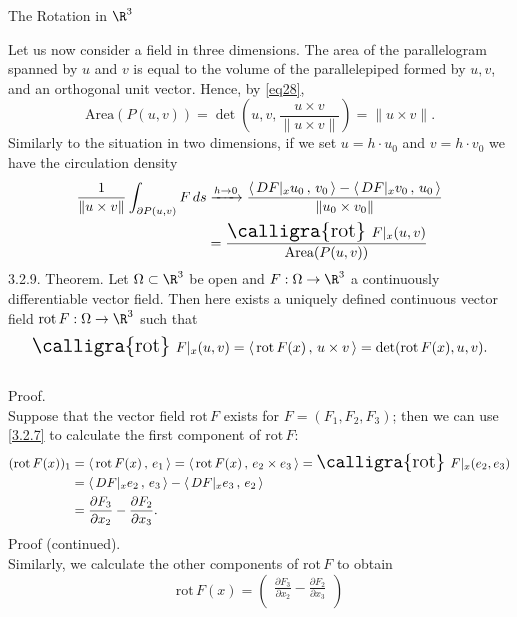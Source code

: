 \documentclass[smaller,hyperref={CJKbookmarks=true}]{beamer}
\newcommand{\scp}[2]{\left\langle\,#1\,,\,#2\,\right\rangle} \newcommand{\scpp}{\langle\,\cdot\,,\,\cdot\,\rangle}
\newcommand{\rot}{\text{\Large{\calligra{rot}}\,}}
\begin{document}
\begin{frame}{The Rotation in $\R^3$}
\begin{spacing}{1.1}
Let us now consider a field in three dimensions. The area of the
parallelogram spanned by $u$ and $v$ is equal to the volume of the
parallelepiped formed by $u, v$, and an orthogonal unit vector. Hence, by
\eqref{eq28},
\[\text{Area}(P(u,v))=\det\left(u,v,
\frac{u\times v}{\|u\times v\|}\right)=\|u\times v\|.\]
Similarly to the situation in two dimensions, if we set $u=h\cdot u_0$ and $v=h\cdot v_0$ we have the circulation density
\begin{equation*}
  \begin{split}
     \frac{1}{\|u\times v\|}\int_{\partial P(u,v)}F\,ds &\xrightarrow[]{h\to0}\frac{\scp{DF|_xu_0}{v_0}-\scp{DF|_xv_0}{u_0}}{\|u_0\times v_0\|} \\
       &=\frac{\rot\,F|_x(u,v)}{\text{Area}(P(u,v))}
  \end{split}
\end{equation*}
\newpage
\alert{3.2.9. Theorem.} Let $\Omega\subset\R^3$ be open and $F:\Omega\to\R^3$ a continuously dif{}ferentiable vector field. Then here exists a uniquely defined continuous vector field $\text{rot}\,F:\Omega\to\R^3$ such that
\begin{equation}\label{3.2.7}
  \rot\,F|_x(u,v)=\scp{\text{rot}\,F(x)}{u\times v}=\det(\text{rot}\,F(x),u,v).
\end{equation}
 \\[9pt]
\alert{Proof.}\\
Suppose that the vector field $\text{rot}\,F$ exists for $F=(F_1,F_2,F_3)$; then we can use \eqref{3.2.7} to calculate the first component of $\text{rot}\,F$:
\begin{equation*}
  \begin{split}
     (\text{rot}\,F(x))_1 &=\scp{\text{rot}\,F(x)}{e_1}
     =\scp{\text{rot}\,F(x)}{e_2\times e_3}=\rot\,F|_x(e_2,e_3) \\
       &=\scp{DF|_xe_2}{e_3}-\scp{DF|_xe_3}{e_2} \\
       &=\frac{\partial F_3}{\partial x_2}-\frac{\partial F_2}{\partial x_3}.
  \end{split}
\end{equation*}
\newpage
\alert{Proof (continued).}\\
Similarly, we calculate the other components of $\text{rot}\,F$ to obtain
\[\text{rot}\,F(x)=\begin{pmatrix}
                     \frac{\partial F_3}{\partial x_2}-\frac{\partial F_2}{\partial x_3} \\[4pt]

\end{pmatrix}\]
\end{spacing}
\end{frame}
\end{document}
